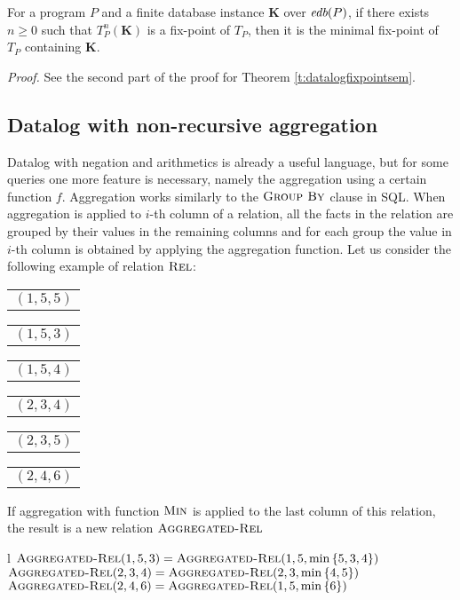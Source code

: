 \begin{thm}
For a program $P$ and a finite database instance $\textbf{K}$ over $\textit{edb}(P)$, if there exists $n \ge 0$ such that $T_P^n(\textbf{K})$ is a fix-point of $T_P$, then it is the minimal fix-point of $T_P$ containing $\textbf{K}$.
\end{thm}
\emph{Proof.} See the second part of the proof for Theorem \ref{t:datalogfixpointsem}.


\subsection{Datalog with non-recursive aggregation}\label{ss:datalognra}

Datalog with negation and arithmetics is already a useful language, but for some queries one more feature is necessary, namely the  aggregation using a certain function $f$. Aggregation works similarly to the $\textsc{Group By}$ clause in SQL. When aggregation is applied to $i$-th column of a relation, all the facts in the relation are grouped by their values in the remaining columns and for each group the value in $i$-th column is obtained by applying the aggregation function.
Let us consider the following example of relation $\textsc{Rel}$:

\begin{center}
\begin{tabular}{l}
  $(1, 5, 5)$
\end{tabular}
\quad
\begin{tabular}{l}
  $(1, 5, 3)$
\end{tabular}
\quad
\begin{tabular}{l}
  $(1, 5, 4)$
\end{tabular}
\quad
\begin{tabular}{l}
  $(2, 3, 4)$
\end{tabular}
\quad
\begin{tabular}{l}
  $(2, 3, 5)$
\end{tabular}
\quad
\begin{tabular}{l}
  $(2, 4, 6)$
\end{tabular}
\end{center}


If aggregation with function $\textsc{Min}$ is applied to the last column of this relation, the result is a new relation $\textsc{Aggregated-Rel}$

\begin{centab}{ l }
  $\textsc{Aggregated-Rel}(1, 5, 3) = \textsc{Aggregated-Rel}(1, 5, \min{\{5, 3, 4\}})$ \\
  $\textsc{Aggregated-Rel}(2, 3, 4) = \textsc{Aggregated-Rel}(2, 3, \min{\{4, 5\}})$ \\
  $\textsc{Aggregated-Rel}(2, 4, 6) = \textsc{Aggregated-Rel}(1, 5, \min{\{6\}})$ \\
\end{centab}


